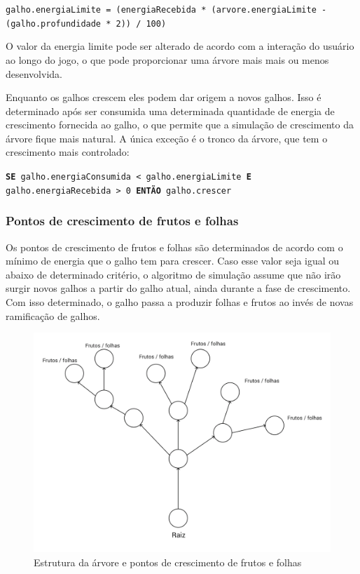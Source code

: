 \documentclass[12pt]{article}
\begin{document}
  \texttt{\footnotesize{galho.energiaLimite = (energiaRecebida * (arvore.energiaLimite - (galho.profundidade * 2)) / 100)}}

O valor da energia limite pode
ser alterado de acordo com a intera\c c\~ao do usu\'ario ao longo do jogo, o que pode proporcionar uma \'arvore mais
mais ou menos desenvolvida.

Enquanto os galhos crescem eles podem dar origem a novos galhos. Isso \'e determinado ap\'os ser consumida uma determinada
quantidade de energia de crescimento fornecida ao galho, o que permite que a simula\c c\~ao de crescimento da \'arvore
fique mais natural. A \'unica exce\c c\~ao \'e o tronco da \'arvore, que tem o crescimento
mais controlado:

\texttt{\footnotesize{\textbf{SE} galho.energiaConsumida < galho.energiaLimite \textbf{E} galho.energiaRecebida > 0
\textbf{ENT\~AO} galho.crescer}}

\subsubsection{Pontos de crescimento de frutos e folhas}
Os pontos de crescimento de frutos e folhas s\~ao determinados de acordo com o m\'inimo de energia que o galho
tem para crescer. Caso esse valor seja igual ou abaixo de determinado crit\'erio, o algoritmo de simula\c c\~ao assume
que n\~ao ir\~ao surgir novos galhos a partir do galho atual, ainda durante a fase de crescimento. Com isso determinado,
o galho passa a produzir folhas e frutos ao inv\'es de novas ramifica\c c\~ao de galhos.

	\begin{figure}[ht!]
	\begin{center}
		\includegraphics[scale=0.15]{img/PI3_Arvore.png}
		\footnotesize \caption{Estrutura da \'arvore e pontos de crescimento de frutos e folhas }
	\end{center}
	\end{figure}	
\end{document}
